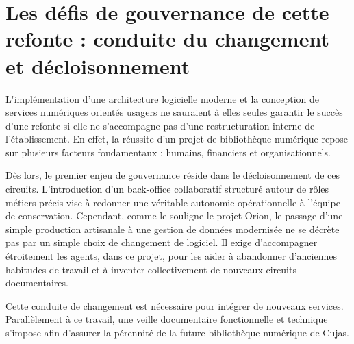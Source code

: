 \chapter[Les défis de gouvernance de cette refonte]{Les défis de gouvernance de cette refonte : conduite du changement et décloisonnement}

\lettrine{L}'implémentation d'une architecture logicielle moderne et la conception de services numériques orientés usagers ne sauraient à elles seules garantir le succès d'une refonte si elle ne s'accompagne pas d'une restructuration interne de l'établissement. En effet, la réussite d'un projet de bibliothèque numérique repose sur plusieurs facteurs fondamentaux : humains, financiers et organisationnels.

Dès lors, le premier enjeu de gouvernance réside dans le décloisonnement de ces circuits. L'introduction d'un back-office collaboratif structuré autour de rôles métiers précis vise à redonner une véritable autonomie opérationnelle à l'équipe de conservation. Cependant, comme le souligne le projet Orion, le passage d'une simple production artisanale à une gestion de données modernisée ne se décrète pas par un simple choix de changement de logiciel. Il exige d'accompagner étroitement les agents, dans ce projet, pour les aider à abandonner d'anciennes habitudes de travail et à inventer collectivement de nouveaux circuits documentaires. 

Cette conduite de changement est nécessaire pour intégrer de nouveaux services. Parallèlement à ce travail, une veille documentaire fonctionnelle et technique s'impose afin d'assurer la pérennité de la future bibliothèque numérique de Cujas.

